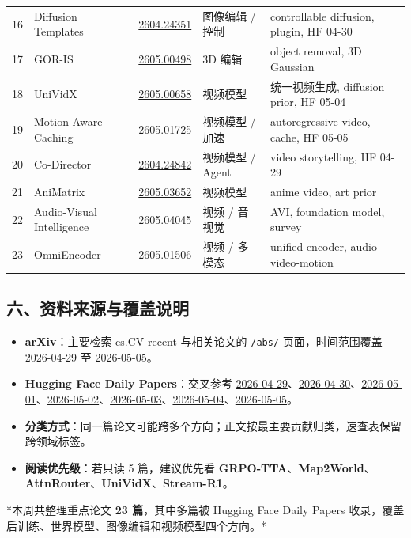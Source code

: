 \begin{longtable}{p{0.7cm}p{3.0cm}p{2.5cm}p{2.5cm}p{4.8cm}}
16 & Diffusion Templates & \href{https://arxiv.org/abs/2604.24351}{2604.24351} & 图像编辑 / 控制 & controllable diffusion, plugin, HF 04-30 \\
17 & GOR-IS & \href{https://arxiv.org/abs/2605.00498}{2605.00498} & 3D 编辑 & object removal, 3D Gaussian \\
18 & UniVidX & \href{https://arxiv.org/abs/2605.00658}{2605.00658} & 视频模型 & 统一视频生成, diffusion prior, HF 05-04 \\
19 & Motion-Aware Caching & \href{https://arxiv.org/abs/2605.01725}{2605.01725} & 视频模型 / 加速 & autoregressive video, cache, HF 05-05 \\
20 & Co-Director & \href{https://arxiv.org/abs/2604.24842}{2604.24842} & 视频模型 / Agent & video storytelling, HF 04-29 \\
21 & AniMatrix & \href{https://arxiv.org/abs/2605.03652}{2605.03652} & 视频模型 & anime video, art prior \\
22 & Audio-Visual Intelligence & \href{https://arxiv.org/abs/2605.04045}{2605.04045} & 视频 / 音视觉 & AVI, foundation model, survey \\
23 & OmniEncoder & \href{https://arxiv.org/abs/2605.01506}{2605.01506} & 视频 / 多模态 & unified encoder, audio-video-motion \\
\bottomrule
\end{longtable}
\normalsize

\subsection{六、资料来源与覆盖说明}

\begin{itemize}[leftmargin=1.5em]
  \item \textbf{arXiv}：主要检索 \href{https://arxiv.org/list/cs.CV/recent}{cs.CV recent} 与相关论文的 \texttt{/abs/} 页面，时间范围覆盖 2026-04-29 至 2026-05-05。
  \item \textbf{Hugging Face Daily Papers}：交叉参考 \href{https://huggingface.co/papers?date=2026-04-29}{2026-04-29}、\href{https://huggingface.co/papers?date=2026-04-30}{2026-04-30}、\href{https://huggingface.co/papers?date=2026-05-01}{2026-05-01}、\href{https://huggingface.co/papers?date=2026-05-02}{2026-05-02}、\href{https://huggingface.co/papers?date=2026-05-03}{2026-05-03}、\href{https://huggingface.co/papers?date=2026-05-04}{2026-05-04}、\href{https://huggingface.co/papers?date=2026-05-05}{2026-05-05}。
  \item \textbf{分类方式}：同一篇论文可能跨多个方向；正文按最主要贡献归类，速查表保留跨领域标签。
  \item \textbf{阅读优先级}：若只读 5 篇，建议优先看 \textbf{GRPO-TTA}、\textbf{Map2World}、\textbf{AttnRouter}、\textbf{UniVidX}、\textbf{Stream-R1}。
\end{itemize}

*本周共整理重点论文 \textbf{23 篇}，其中多篇被 Hugging Face Daily Papers 收录，覆盖后训练、世界模型、图像编辑和视频模型四个方向。*